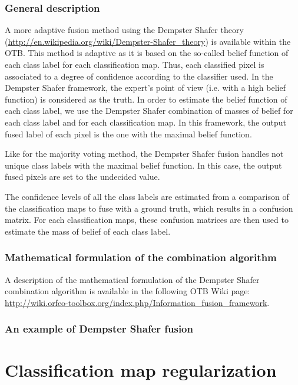 \subsubsection{General description}
A more adaptive fusion method using the Dempster Shafer theory 
(\href{http://en.wikipedia.org/wiki/Dempster-Shafer_theory}{http://en.wikipedia.org/wiki/Dempster-Shafer\_theory}) 
is available within the OTB. This method is adaptive as it is based on the 
so-called belief function of each class label for each classification map. Thus, 
each classified pixel is associated to a degree of confidence according to the 
classifier used. In the Dempster Shafer framework, the expert's point of view 
(i.e. with a high belief function) is considered as the truth. In order to 
estimate the belief function of each class label, we use the Dempster Shafer 
combination of masses of belief for each class label and for each classification 
map. In this framework, the output fused label of each pixel is the one with the 
maximal belief function.

Like for the majority voting method, the Dempster Shafer fusion handles not 
unique class labels with the maximal belief function. In this case, the output 
fused pixels are set to the undecided value.

The confidence levels of all the class labels are estimated from a comparison of 
the classification maps to fuse with a ground truth, which results in a 
confusion matrix. For each classification maps, these confusion matrices are then 
used to estimate the mass of belief of each class label.


\subsubsection{Mathematical formulation of the combination algorithm}

A description of the mathematical formulation of the Dempster Shafer combination 
algorithm is available in the following OTB Wiki page: 
\href{http://wiki.orfeo-toolbox.org/index.php/Information_fusion_framework}{http://wiki.orfeo-toolbox.org/index.php/Information\_fusion\_framework}.

\subsubsection{An example of Dempster Shafer fusion}
\ifitkFullVersion

\fi


\section{Classification map regularization}


\ifitkFullVersion

\fi



